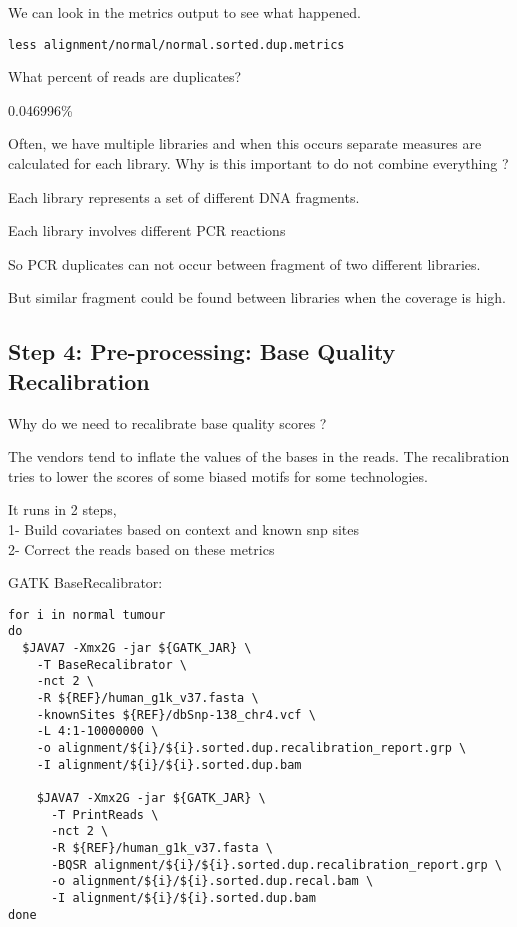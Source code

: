 We can look in the metrics output to see what happened.

\begin{lstlisting}
less alignment/normal/normal.sorted.dup.metrics
\end{lstlisting}

\begin{questions} 
What percent of reads are duplicates?
\end{questions}
\begin{answer}
0.046996\%
\end{answer}

\begin{questions} 
Often, we have multiple libraries and when this occurs separate measures are calculated for each library. Why is this important to do not combine everything ?
\end{questions}
\begin{answer}
Each library represents a set of different DNA fragments.

Each library involves different PCR reactions

So PCR duplicates can not occur between fragment of two different libraries.

But similar fragment could be found between libraries when the coverage is high.
\end{answer}


\subsection{Step 4: Pre-processing: Base Quality Recalibration}

\begin{questions}
Why do we need to recalibrate base quality scores ?
\end{questions}
\begin{answer}
The vendors tend to inflate the values of the bases in the reads.
The recalibration tries to lower the scores of some biased motifs for some technologies.
\end{answer}

It runs in 2 steps, \\
1- Build covariates based on context and known snp sites \\
2- Correct the reads based on these metrics

GATK BaseRecalibrator:

\begin{lstlisting}
for i in normal tumour
do
  $JAVA7 -Xmx2G -jar ${GATK_JAR} \
    -T BaseRecalibrator \
    -nct 2 \
    -R ${REF}/human_g1k_v37.fasta \
    -knownSites ${REF}/dbSnp-138_chr4.vcf \
    -L 4:1-10000000 \
    -o alignment/${i}/${i}.sorted.dup.recalibration_report.grp \
    -I alignment/${i}/${i}.sorted.dup.bam

    $JAVA7 -Xmx2G -jar ${GATK_JAR} \
      -T PrintReads \
      -nct 2 \
      -R ${REF}/human_g1k_v37.fasta \
      -BQSR alignment/${i}/${i}.sorted.dup.recalibration_report.grp \
      -o alignment/${i}/${i}.sorted.dup.recal.bam \
      -I alignment/${i}/${i}.sorted.dup.bam
done
\end{lstlisting}

